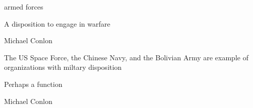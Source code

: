 \documentclass[letterpaper,10pt,english]{sphinxmanual}
\begin{document}
\begin{sphinxShadowBox}

\sphinxAtStartPar
armed forces
\end{sphinxShadowBox}

\begin{sphinxShadowBox}

\sphinxAtStartPar
{\hyperref[\detokenize{doc-BFO_0000016::doc}]{}}
\end{sphinxShadowBox}

\begin{sphinxShadowBox}

\sphinxAtStartPar
A disposition to engage in warfare
\end{sphinxShadowBox}

\begin{sphinxShadowBox}

\sphinxAtStartPar
Michael Conlon 
\end{sphinxShadowBox}

\begin{sphinxShadowBox}

\sphinxAtStartPar
The US Space Force, the Chinese Navy, and the Bolivian Army are example of organizations with miltary disposition
\end{sphinxShadowBox}

\begin{sphinxShadowBox}

\sphinxAtStartPar
Perhaps a function
\end{sphinxShadowBox}

\begin{sphinxShadowBox}

\sphinxAtStartPar
Michael Conlon 
\end{sphinxShadowBox}
\begin{quote}

\ignorespaces \end{quote}
\end{document}
